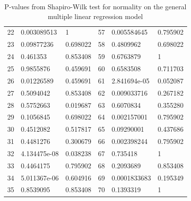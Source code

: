 \begin{table}[H]
\begin{tabular}{c:ll|c:ll}
        22 & 0.003089513 & 1 & 57 & 0.005584645 & 0.795902\\ 
        23 & 0.09877236 & 0.698022 & 58 & 0.4809962 & 0.698022\\ 
        24 & 0.461353 & 0.853408 & 59 & 0.6763879 & 1\\ 
        25 & 0.9855876 & 0.459691 & 60 & 0.6583508 & 0.711703\\ 
        26 & 0.01226589 & 0.459691 & 61 & 2.841694e-05 & 0.052087\\
        27 & 0.5094042 & 0.853408 & 62 & 0.009033716 & 0.267182\\ 
        28 & 0.5752663 & 0.019687 & 63 & 0.6070834 & 0.355280\\ 
        29 & 0.1056845 & 0.698022 & 64 & 0.002157001 & 0.795902\\ 
        30 & 0.4512082 & 0.517817 & 65 & 0.09290001 & 0.437686\\ 
        31 & 0.4481276 & 0.300679 & 66 & 0.002398244 & 0.795902\\ 
        32 & 4.134475e-08 & 0.038238 & 67 & 0.735418 & 1\\ 
        33 & 0.4464175 & 0.795902 & 68 & 0.2093689 & 0.853408\\ 
        34 & 5.011367e-06 & 0.604916 & 69 & 0.0001833683 & 0.195349\\
        35 & 0.8539095 & 0.853408 & 70 & 0.1393319 & 1 \\
        \hline
    \end{tabular}
    \caption{P-values from Shapiro-Wilk test for normality on the general multiple linear regression model}
    \label{tab: shapiro_multiple_lm}
\end{table}

